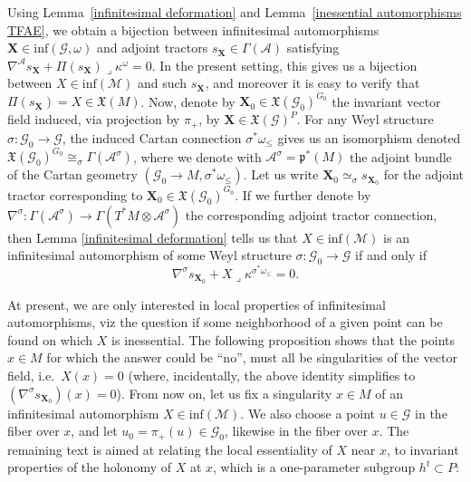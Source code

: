 \documentclass[11pt]{article}
\def\k{\kappa}
\def\p{\mathfrak{p}}
\def\Abdle{\mathcal{A}}
\def\Gbdle{\mathcal{G}}
\def\VF{\mathfrak{X}}
\def\:{\lrcorner}
\def\tens{\otimes}
\def\isom{\cong}
\theoremstyle{plain}
\theoremstyle{definition}
\begin{document}
Using Lemma~\ref{infinitesimal deformation} and Lemma~\ref{inessential automorphisms TFAE}, we obtain a bijection between inf\/initesimal automorphisms $\mathbf{X} \in \mathrm{inf}(\Gbdle,\omega)$ and adjoint tractors $s_{\mathbf{X}} \in \Gamma(\Abdle)$ satisfying $\nabla^{\Abdle}s_{\mathbf{X}} + \Pi(s_{\mathbf{X}}) \: \k^{\omega} = 0$. In the present setting, this gives us a bijection between $X \in \mathrm{inf}(\mathcal{M})$ and such $s_{\mathbf{X}}$, and moreover it is easy to verify that $\Pi(s_{\mathbf{X}}) = X \in \VF(M)$. Now, denote by $\mathbf{X}_0 \in \VF(\Gbdle_0)^{G_0}$ the invariant vector f\/ield induced, via projection by $\pi_+$, by $\mathbf{X} \in \VF(\Gbdle)^P$. For any Weyl structure $\sigma: \Gbdle_0 \rightarrow \Gbdle$, the induced Cartan connection $\sigma^*\omega_{\leq}$ gives us an isomorphism denoted $\VF(\Gbdle_0)^{G_0} \isom_{\sigma} \Gamma(\Abdle^{\sigma})$, where we denote with $\Abdle^{\sigma} = \p^*(M)$ the adjoint bundle of the Cartan geometry $(\Gbdle_0 \rightarrow M,\sigma^*\omega_{\leq})$. Let us write $\mathbf{X}_0 \simeq_{\sigma} s_{\mathbf{X}_0}$ for the adjoint tractor corresponding to $\mathbf{X}_0 \in \VF(\Gbdle_0)^{G_0}$. If we further denote by $\nabla^{\sigma}: \Gamma(\Abdle^{\sigma}) \rightarrow \Gamma(T^*M\tens\Abdle^{\sigma})$ the corresponding adjoint tractor connection, then Lemma \ref{infinitesimal deformation} tells us that $X \in \mathrm{inf}(\mathcal{M})$ is an inf\/initesimal automorphism of some Weyl structure $\sigma: \Gbdle_0 \rightarrow \Gbdle$ if and only if
\[
\nabla^{\sigma} s_{\mathbf{X}_0} + X \: \k^{\sigma^*\omega_{\leq}} = 0.
\]

At present, we are only interested in local properties of inf\/initesimal automorphisms, viz the question if some neighborhood of a given point can be found on which $X$ is inessential. The following proposition shows that the points $x \in M$ for which the answer could be ``no'', must all be singularities of the vector f\/ield, i.e.\ $X(x)=0$ (where, incidentally, the above identity simplif\/ies to $(\nabla^{\sigma} s_{\mathbf{X}_0})(x) = 0$).
\setcounter{section}{4}
\setcounter{subsection}{2}
\setcounter{subsubsection}{0}
\setcounter{Theorem}{2}
\setcounter{equation}{7}
From now on, let us f\/ix a singularity $x \in M$ of an inf\/initesimal automorphism $X \in \mathrm{inf}(\mathcal{M})$. We also choose a point $u \in \Gbdle$ in the f\/iber over $x$, and let $u_0 = \pi_+(u) \in \Gbdle_0$, likewise in the f\/iber over $x$. The remaining text is aimed at relating the local essentiality of $X$ near $x$, to invariant properties of the holonomy of $X$ at $x$, which is a one-parameter subgroup $h^t \subset P$:
\end{document}
